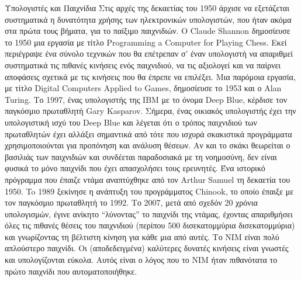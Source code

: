 \documentclass[a4paper,11pt,oneside]{book}
\begin{document}
{{{\begin{theory}{Υπολογιστές και Παιχνίδια}
Στις αρχές της δεκαετίας του 1950 άρχισε να εξετάζεται συστηματικά η δυνατότητα χρήσης των ηλεκτρονικών υπολογιστών, που ήταν ακόμα στα πρώτα τους βήματα, για το παίξιμο παιχνιδιών.
Ο Claude Shannon %
δημοσίευσε το 1950 μια εργασία με τίτλο Programming a Computer for Playing Chess. Εκεί περιέγραψε ένα σύνολο τεχνικών που θα επέτρεπαν σ' έναν υπολογιστή να απαριθμεί συστηματικά τις πιθανές κινήσεις ενός παιχνιδιού, να τις αξιολογεί και να παίρνει αποφάσεις σχετικά με τις κινήσεις που θα έπρεπε να επιλέξει. Μια παρόμοια εργασία, με τίτλο Digital Computers Applied to Games, δημοσίευσε το 1953 και ο Alan Turing. Το 1997, ένας υπολογιστής της IBM με το όνομα Deep Blue, κέρδισε τον παγκόσμιο πρωταθλητή Gary Kasparov. Σήμερα, ένας οικιακός υπολογιστής έχει την υπολογιστική ισχύ του Deep Blue και λέγεται ότι ο τρόπος παιχνιδιού των πρωταθλητών έχει αλλάξει σημαντικά από τότε που ισχυρά σκακιστικά προγράμματα χρησιμοποιούνται για προπόνηση και ανάλυση θέσεων. Αν και το σκάκι θεωρείται ο βασιλιάς των παιχνιδιών και συνδέεται παραδοσιακά με τη νοημοσύνη, δεν είναι φυσικά το μόνο παιχνίδι που έχει απασχολήσει τους ερευνητές. Ένα ιστορικό πρόγραμμα που έπαιζε ντάμα αναπτύχθηκε από τον Arthur Samuel τη δεκαετία του 1950. To 1989 ξεκίνησε η ανάπτυξη του προγράμματος Chinook, το οποίο έπαιξε με τον παγκόσμιο πρωταθλητή το 1992. Το 2007, μετά από σχεδόν 20 χρόνια υπολογισμών, έγινε ανίκητο ``λύνοντας'' το παιχνίδι της ντάμας, έχοντας απαριθμήσει όλες τις πιθανές θέσεις του παιχνιδιού (περίπου 500 δισεκατομμύρια δισεκατομμύρια) και γνωρίζοντας τη βέλτιστη κίνηση για κάθε μια από αυτές. Το ΝΙΜ είναι πολύ απλούστερο παιχνίδι. Οι  (αποδεδειγμένα) καλύτερες δυνατές κινήσεις είναι γνωστές και υπολογίζονται εύκολα. Αυτός είναι ο λόγος που το ΝΙΜ ήταν πιθανότατα το πρώτο παιχνίδι που αυτοματοποιήθηκε.
\end{theory}

}}}
\end{document}
